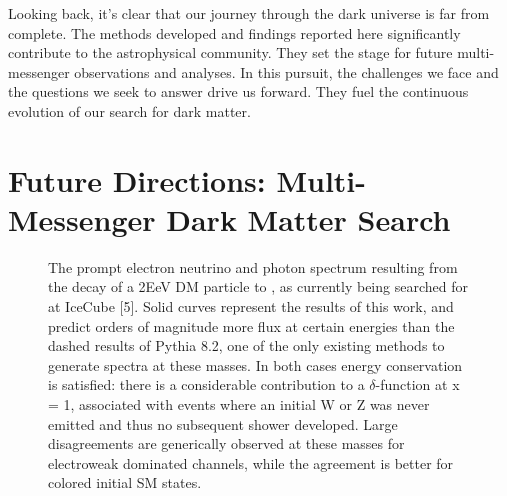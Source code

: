 Looking back, it's clear that our journey through the dark universe is far from complete. The methods developed and findings reported here significantly contribute to the astrophysical community. They set the stage for future multi-messenger observations and analyses. In this pursuit, the challenges we face and the questions we seek to answer drive us forward. They fuel the continuous evolution of our search for dark matter.

\section{Future Directions: Multi-Messenger Dark Matter Search}\label{sec:future}

\begin{figure}[h]
    \caption{The prompt electron neutrino and photon spectrum resulting from the decay of a 2EeV DM particle to , as currently being searched for at IceCube [5]. Solid curves represent the results of this work, and predict orders of magnitude more flux at certain energies than the dashed results of Pythia 8.2, one of the only existing methods to generate spectra at these masses. In both cases energy conservation is satisfied: there is a considerable contribution to a $\delta$-function at x = 1, associated with events where an initial W or Z was never emitted and thus no subsequent shower developed. Large disagreements are generically observed at these masses for electroweak dominated channels, while the agreement is better for colored initial SM states.}
    \label{fig:nu_and_gam}
\end{figure}

